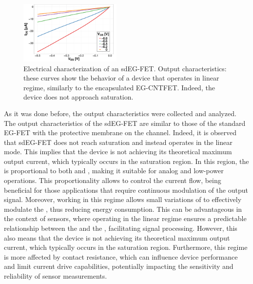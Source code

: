 \begin{figure}
    \centering
    \includegraphics[width = 0.45\textwidth]{figures/chapter3/sdEGFET/sdOutput.pdf}
    \caption{Electrical characterization of an sdEG-FET.
        Output characteristics: these curves show the behavior of a device that operates in linear regime, similarly to the encapsulated EG-CNTFET. Indeed, the device does not approach saturation.}
    \label{fig:sdOutput}
\end{figure}

As it was done before, the output characteristics were collected and analyzed. The output characteristics of the sdEG-FET are similar to those of the standard EG-FET with the protective membrane on the channel. Indeed, it is observed that sdEG-FET does not reach saturation and instead operates in the linear mode.
This implies that the device is not achieving its theoretical maximum output current, which typically occurs in the saturation region. In this region, the \ids{} is proportional to both \vgs{} and \vds{}, making it suitable for analog and low-power operations. This proportionality allows to control the current flow, being beneficial for those applications that require continuous modulation of the output signal. Moreover, working in this regime allows small variations of \vgs{} to effectively modulate the \ids{}, thus reducing energy consumption. This can be advantageous in the context of sensors, where operating in the linear regime ensures a predictable relationship between the \vgs{} and the \ids{}, facilitating signal processing. However, this also means that the device is not achieving its theoretical maximum output current, which typically occurs in the saturation region. Furthermore, this regime is more affected by contact resistance, which can influence device performance and limit current drive capabilities, potentially impacting the sensitivity and reliability of sensor measurements.

